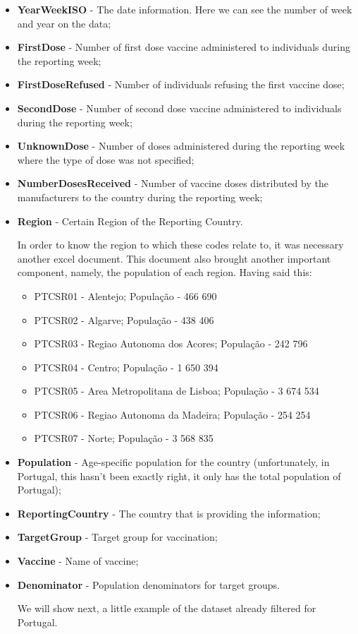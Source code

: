 \begin{itemize}
    \item \textbf{YearWeekISO} - The date information. Here we can see the number of week and year on the data;
    \item \textbf{FirstDose} - Number of first dose vaccine administered to individuals during the reporting week;
    \item \textbf{FirstDoseRefused} - Number of individuals refusing the first vaccine dose;
    \item \textbf{SecondDose} - Number of second dose vaccine administered to individuals during the reporting week;
    \item \textbf{UnknownDose} - Number of doses administered during the reporting week where the type of dose was not specified;
    \item \textbf{NumberDosesReceived} - Number of vaccine doses distributed by the manufacturers to the country during the reporting week;
    \item \textbf{Region} - Certain Region of the Reporting Country.
   
    In order to know the region to which these codes relate to, it was necessary another excel document. This document also brought another important component, namely, the population of each region. Having said this:
    \begin{itemize}
        \item PTCSR01 - Alentejo; População - 466 690
        \item PTCSR02 - Algarve; População - 438 406
        \item PTCSR03 - Regiao Autonoma dos Acores; População - 242 796
        \item PTCSR04 - Centro; População - 1 650 394
        \item PTCSR05 - Area Metropolitana de Lisboa; População - 3 674 534
        \item PTCSR06 - Regiao Autonoma da Madeira; População - 254 254
        \item PTCSR07 - Norte; População - 3 568 835

    \end{itemize}
    \item \textbf{Population} - Age-specific population for the country (unfortunately, in Portugal, this hasn't been exactly right, it only has the total population of Portugal);
    \item \textbf{ReportingCountry} - The country that is providing the information;
    \item \textbf{TargetGroup} - Target group for vaccination;
    \item \textbf{Vaccine} - Name of vaccine;
    \item \textbf{Denominator} - Population denominators for target groups.

We will show next, a little example of the dataset already filtered for Portugal.

\end{itemize}

